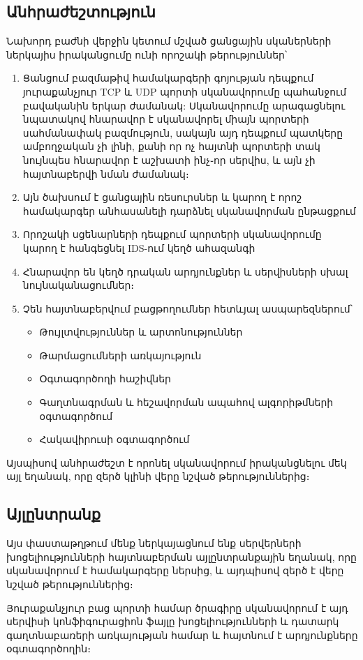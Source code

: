 \documentclass[10pt]{article}
\begin{document}
\begin{sloppypar}
\subsection{Անհրաժեշտություն}


Նախորդ բաժնի վերջին կետում մշված ցանցային սկաներների ներկայիս իրականցումը
ունի որոշակի թերություններ՝

\begin{enumerate}
\item Ցանցում բազմաթիվ համակարգերի գոյության դեպքում յուրաքանչյուր TCP և
	UDP պորտի սկանավորումը պահանջում բավականին երկար ժամանակ:
	Սկանավորումը արագացնելու նպատակով հնարավոր է սկանավորել միայն
	պորտերի սահմանափակ բազմություն, սակայն այդ դեպքում պատկերը ամբողջական
	չի լինի, քանի որ ոչ հայտնի պորտերի տակ նույնպես հնարավոր է աշխատի
	ինչ֊որ սերվիս, և այն չի հայտնաբերվի նման ժամանակ։
\item Այն ծախսում է ցանցային ռեսուրսներ և կարող է որոշ համակարգեր
    անհասանելի դարձնել սկանավորման ընթացքում
\item Որոշակի սցենարների դեպքում պորտերի սկանավորումը կարող է
    հանգեցնել IDS-ում կեղծ ահազանգի
\item Հնարավոր են կեղծ դրական արդյունքներ և սերվիսների սխալ
	նույնականացումներ։
\item Չեն հայտնաբերվում բացթողումներ հետևյալ ասպարեզներում՝
	\begin{itemize}
	\item Թույլտվություններ և արտոնություններ
	\item Թարմացումների առկայություն
	\item Օգտագործողի հաշիվներ
	\item Գաղտնագրման և հեշավորման ապահով ալգորիթմների օգտագործում
	\item Հակավիրուսի օգտագործում
	\end{itemize}
\end{enumerate}

Այսպիսով անհրաժեշտ է որոնել սկանավորում իրականցնելու մեկ այլ եղանակ,
որը զերծ կլինի վերը նշված թերություններից։


\subsection{Այլընտրանք}


Այս փաստաթղթում մենք ներկայացնում ենք սերվերների խոցելիությունների
հայտնաբերման այլընտրանքային եղանակ, որը սկանավորում է համակարգերը
ներսից, և այդպիսով զերծ է վերը նշված թերություններից։

Յուրաքանչյուր բաց պորտի համար ծրագիրը սկանավորում է այդ սերվիսի
կոնֆիգուրացիոն ֆայլը խոցելիությունների և դատարկ գաղտնաբառերի
առկայության համար և հայտնում է արդյունքները օգտագործողին։


\end{sloppypar}
\end{document}
